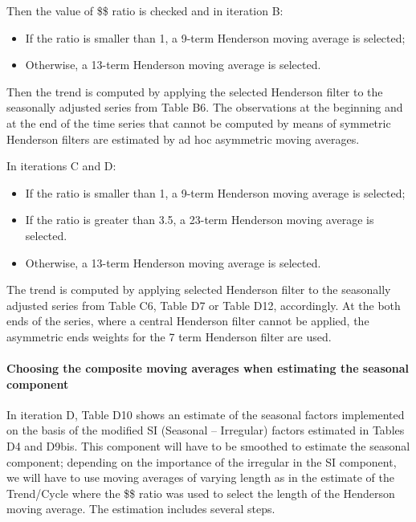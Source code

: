 \documentclass[
  letterpaper,
  DIV=11,
  numbers=noendperiod]{scrreprt}
\let\oldparagraph\paragraph
\renewcommand{\paragraph}[1]{\oldparagraph{#1}\mbox{}}
\begin{document}
Then the value of \$\$ ratio is checked
and in iteration B:

\begin{itemize}
\item
  If the ratio is smaller than 1, a 9-term Henderson moving average is
  selected;
\item
  Otherwise, a 13-term Henderson moving average is selected.
\end{itemize}

Then the trend is computed by applying the selected Henderson filter to
the seasonally adjusted series from Table B6. The observations at the
beginning and at the end of the time series that cannot be computed by
means of symmetric Henderson filters are estimated by ad hoc asymmetric
moving averages.

In iterations C and D:

\begin{itemize}
\item
  If the ratio is smaller than 1, a 9-term Henderson moving average is
  selected;
\item
  If the ratio is greater than 3.5, a 23-term Henderson moving average
  is selected.
\item
  Otherwise, a 13-term Henderson moving average is selected.
\end{itemize}

The trend is computed by applying selected Henderson filter to the
seasonally adjusted series from Table C6, Table D7 or Table D12,
accordingly. At the both ends of the series, where a central Henderson
filter cannot be applied, the asymmetric ends weights for the 7 term
Henderson filter are used.

\hypertarget{choosing-the-composite-moving-averages-when-estimating-the-seasonal-component}{%
\paragraph{\texorpdfstring{\textbf{Choosing the composite moving
averages when estimating the seasonal
component}}{Choosing the composite moving averages when estimating the seasonal component}}\label{choosing-the-composite-moving-averages-when-estimating-the-seasonal-component}}

In iteration D, Table D10 shows an estimate of the seasonal factors
implemented on the basis of the modified SI (Seasonal -- Irregular)
factors estimated in Tables D4 and D9bis. This component will have to be
smoothed to estimate the seasonal component; depending on the importance
of the irregular in the SI component, we will have to use moving
averages of varying length as in the estimate of the Trend/Cycle where
the \$\$ ratio was used to select the
length of the Henderson moving average. The estimation includes several
steps.
\end{document}
